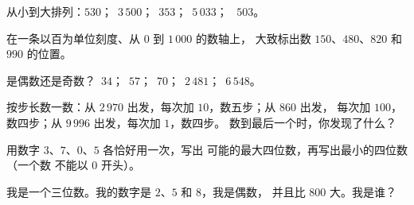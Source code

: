 \begin{exercise}[$\star$]\label{exo:g3:numbers:6}
从小到大排列：$530$；\ $3\,500$；\ $353$；\ $5\,033$；
\ $503$。
\end{exercise}

\begin{exercise}[$\star$]\label{exo:g3:numbers:7}
在一条以百为单位刻度、从 $0$ 到 $1\,000$ 的数轴上，
大致标出数 $150$、$480$、$820$ 和 $990$ 的位置。
\end{exercise}

\begin{exercise}[$\star$]\label{exo:g3:numbers:8}
是偶数还是奇数？\ $34$；\ $57$；\ $70$；\ $2\,481$；\ $6\,548$。
\end{exercise}

\begin{exercise}[$\star$]\label{exo:g3:numbers:9}
按步长数一数：从 $2\,970$ 出发，每次加 $10$，数五步；从 $860$ 出发，
每次加 $100$，数四步；从 $9\,996$ 出发，每次加 $1$，数四步。
数到最后一个时，你发现了什么？
\end{exercise}

\begin{exercise}[$\star\star$]\label{exo:g3:numbers:10}
用数字 $3$、$7$、$0$、$5$ 各恰好用一次，写出
可能的最大四位数，再写出最小的四位数（一个数
不能以 $0$ 开头）。
\end{exercise}

\begin{exercise}[$\star\star$]\label{exo:g3:numbers:11}
我是一个三位数。我的数字是 $2$、$5$ 和 $8$，我是偶数，
并且比 $800$ 大。我是谁？
\end{exercise}
